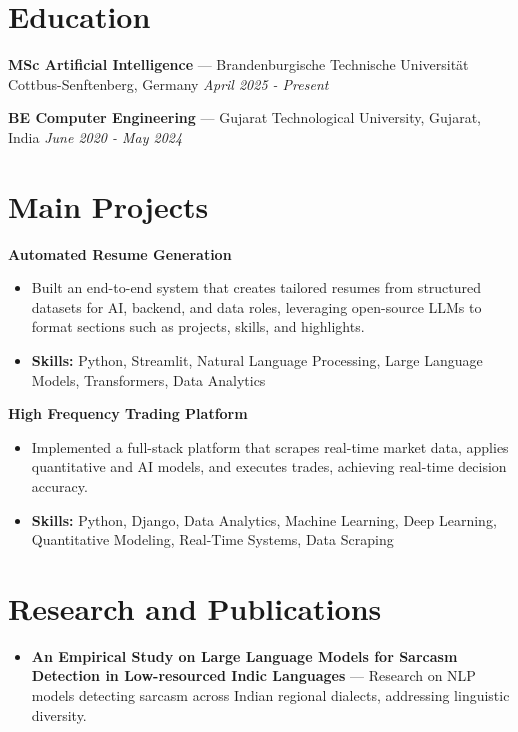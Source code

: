 \documentclass[a4paper,10pt]{article}
\begin{document}
\section*{Education}
\textbf{MSc Artificial Intelligence} — Brandenburgische Technische Universität Cottbus-Senftenberg, Germany \hfill \textit{April 2025 - Present}\par
\vspace{1.5pt}
\textbf{BE Computer Engineering} — Gujarat Technological University, Gujarat, India \hfill \textit{June 2020 - May 2024}\par

\section*{Main Projects}
\textbf{Automated Resume Generation}\par
\vspace{1pt}
\begin{itemize}
  \item Built an end-to-end system that creates tailored resumes from structured datasets for AI, backend, and data roles, leveraging open-source LLMs to format sections such as projects, skills, and highlights.
  \item \textbf{Skills:} Python, Streamlit, Natural Language Processing, Large Language Models, Transformers, Data Analytics
\end{itemize}
\vspace{3pt}
\textbf{High Frequency Trading Platform}\par
\vspace{1pt}
\begin{itemize}
  \item Implemented a full-stack platform that scrapes real-time market data, applies quantitative and AI models, and executes trades, achieving real-time decision accuracy.
  \item \textbf{Skills:} Python, Django, Data Analytics, Machine Learning, Deep Learning, Quantitative Modeling, Real-Time Systems, Data Scraping
\end{itemize}

\section*{Research and Publications}
\begin{itemize}
\item \textbf{An Empirical Study on Large Language Models for Sarcasm Detection in Low-resourced Indic Languages} — Research on NLP models detecting sarcasm across Indian regional dialects, addressing linguistic diversity.
\end{itemize}
\end{document}
